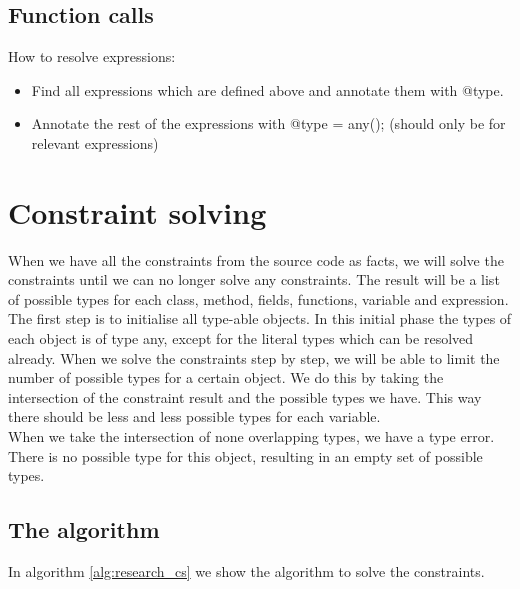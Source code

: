 \documentclass[../main.tex]{subfiles}
\begin{document}
    \subsection{Function calls}
    
    How to resolve expressions:
    \begin{itemize}
        \item Find all expressions which are defined above and annotate them with @type.
        \item Annotate the rest of the expressions with @type = any(); (should only be for relevant expressions)
    \end{itemize}
    
    \section{Constraint solving}\label{sec:research:constraint_solving}
    When we have all the constraints from the source code as facts, we will solve the constraints until we can no longer solve any constraints.
    The result will be a list of possible types for each class, method, fields, functions, variable and expression.
    \\
    The first step is to initialise all type-able objects.
    In this initial phase the types of each object is of type any, except for the literal types which can be resolved already.
    When we solve the constraints step by step, we will be able to limit the number of possible types for a certain object.
    We do this by taking the intersection of the constraint result and the possible types we have.
    This way there should be less and less possible types for each variable.
    \\
    When we take the intersection of none overlapping types, we have a type error.
    There is no possible type for this object, resulting in an empty set of possible types.
    
    \subsection{The algorithm}
    In algorithm \ref{alg:research_cs} we show the algorithm to solve the constraints.
        
\end{document}
